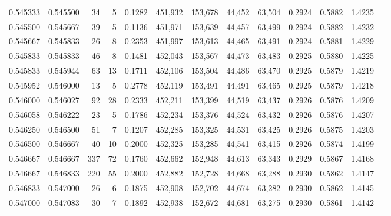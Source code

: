 \begin{tabular}{rrrrrrrrrrrrr}
0.545333 & 0.545500 &    34 &   5 &                                     0.1282 & 451,932 & 153,678 &  44,452 &  63,504 & 0.2924 & 0.5882 & 1.4235 \\
0.545500 & 0.545667 &    39 &   5 &                                     0.1136 & 451,971 & 153,639 &  44,457 &  63,499 & 0.2924 & 0.5882 & 1.4232 \\
0.545667 & 0.545833 &    26 &   8 &                                     0.2353 & 451,997 & 153,613 &  44,465 &  63,491 & 0.2924 & 0.5881 & 1.4229 \\
0.545833 & 0.545833 &    46 &   8 &                                     0.1481 & 452,043 & 153,567 &  44,473 &  63,483 & 0.2925 & 0.5880 & 1.4225 \\
0.545833 & 0.545944 &    63 &  13 &                                     0.1711 & 452,106 & 153,504 &  44,486 &  63,470 & 0.2925 & 0.5879 & 1.4219 \\
0.545952 & 0.546000 &    13 &   5 &                                     0.2778 & 452,119 & 153,491 &  44,491 &  63,465 & 0.2925 & 0.5879 & 1.4218 \\
0.546000 & 0.546027 &    92 &  28 &                                     0.2333 & 452,211 & 153,399 &  44,519 &  63,437 & 0.2926 & 0.5876 & 1.4209 \\
0.546058 & 0.546222 &    23 &   5 &                                     0.1786 & 452,234 & 153,376 &  44,524 &  63,432 & 0.2926 & 0.5876 & 1.4207 \\
0.546250 & 0.546500 &    51 &   7 &                                     0.1207 & 452,285 & 153,325 &  44,531 &  63,425 & 0.2926 & 0.5875 & 1.4203 \\
0.546500 & 0.546667 &    40 &  10 &                                     0.2000 & 452,325 & 153,285 &  44,541 &  63,415 & 0.2926 & 0.5874 & 1.4199 \\
0.546667 & 0.546667 &   337 &  72 &                                     0.1760 & 452,662 & 152,948 &  44,613 &  63,343 & 0.2929 & 0.5867 & 1.4168 \\
0.546667 & 0.546833 &   220 &  55 &                                     0.2000 & 452,882 & 152,728 &  44,668 &  63,288 & 0.2930 & 0.5862 & 1.4147 \\
0.546833 & 0.547000 &    26 &   6 &                                     0.1875 & 452,908 & 152,702 &  44,674 &  63,282 & 0.2930 & 0.5862 & 1.4145 \\
0.547000 & 0.547083 &    30 &   7 &                                     0.1892 & 452,938 & 152,672 &  44,681 &  63,275 & 0.2930 & 0.5861 & 1.4142 \\

\end{tabular}
